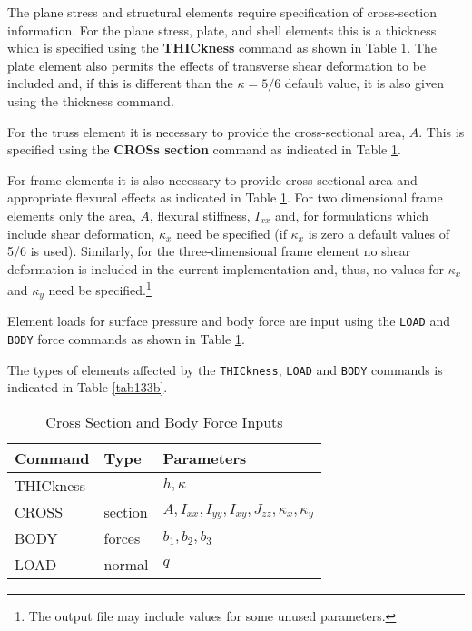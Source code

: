 The plane stress and structural elements require specification of
cross-section information.
For the plane stress, plate, and shell
elements this is a thickness which is specified using the 
\textbf{THICkness} command as shown in Table \ref{tab133a}.
The plate element also permits the effects
of transverse shear deformation to be included and, if this is
different than the $\kappa = 5/6$ default value,
it is also given using the thickness command.

For the truss element it is necessary to provide the cross-sectional area, $A$.
This is specified using the \textbf{CROSs section} command as indicated in
Table \ref{tab133a}.

For frame elements it is also necessary to provide cross-sectional
area and appropriate flexural effects as indicated in Table \ref{tab133a}.
For two dimensional frame elements only the area, $A$, flexural stiffness,
$I_{xx}$ and, for formulations which include shear deformation, $\kappa_x$
need be specified (if $\kappa_x$ is zero a default values of 5/6 is used).
Similarly, for the three-dimensional frame element no
shear deformation is included in the current implementation and, thus, no
values for $\kappa_x$ and $\kappa_y$ need be specified.\footnote{The output file
may include values for some unused parameters.}

Element loads for surface pressure and body force are input using the
{\tt LOAD} and {\tt BODY} force commands as shown in Table \ref{tab133a}.

The types of elements affected by the {\tt THICkness}, {\tt LOAD} and
{\tt BODY} commands is indicated in Table \ref{tab133b}.

\begin{table}[ht!]
\begin{center}
\begin{tabular}{| l | l | l |} \hline
Command & Type & Parameters \\ \hline
THICkness & {}      & $h, \kappa$ \\
CROSS     & section & $A, I_{xx}, I_{yy}, I_{xy},
J_{zz}, \kappa_x, \kappa_y$ \\ \hline
BODY & forces   & $b_1, b_2, b_3$ \\
LOAD & normal   & $q$ \\ \hline
\end{tabular}
\end{center}
\caption{Cross Section and Body Force Inputs}
\label{tab133a}
\end{table}

